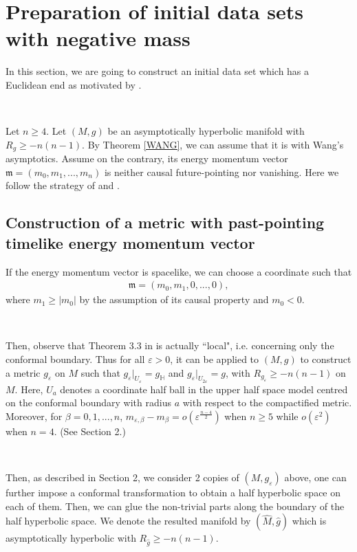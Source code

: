 \documentclass[11pt]{amsart}
\newcommand{\be}{\begin{equation}}
\newcommand{\ee}{\end{equation}}
\theoremstyle{remark}
\numberwithin{equation}{section}
\def\be{\begin{equation}}
\def\ee{\end{equation}}
\def\b{{\beta}}
\def\eps{\varepsilon}
\def\m{\mathfrak{m}}
\def\HH{\mathbb{H}}
\begin{document}
{{\section{Preparation of initial data sets with negative mass}\label{PIDS} In this section, we are going to construct an initial data set which has a Euclidean end as motivated by \cite{CD19}. 

\

Let $n\geq 4$. Let $(M,g)$ be an asymptotically hyperbolic manifold with $R_g\geq -n(n-1)$. By Theorem \ref{WANG}, we can assume that it is with Wang's asymptotics. Assume on the contrary, its energy momentum vector $\m=(m_0, m_1,...,m_n)$ is neither causal future-pointing nor vanishing. Here we follow the strategy of \cite{CD19} and \cite{CGNP18}. 

\subsection{Construction of a metric with past-pointing timelike energy momentum vector}
If the energy momentum vector is spacelike, we can choose a coordinate such that 
\be
\begin{split}
\m=(m_0, m_1,0,...,0), 
\end{split}
\ee 
where $m_1 \geq |m_0|$ by the assumption of its causal property and $m_0<0$. 

\


Then, observe that Theorem 3.3 in \cite{CD15} is actually ``local", i.e. concerning only the conformal boundary. Thus for all $\eps>0$, it can be applied to $(M,g)$ to construct a metric $g_{\eps}$ on $M$ such that $g_{\eps}|_{U_{\eps}}=g_{\HH}$ and $g_{\eps}|_{U_{2\eps}}=g$, with $R_{g_{\eps}}\geq -n(n-1)$ on $M$. Here, $U_{a}$ denotes a coordinate half ball in the upper half space model centred on the conformal boundary with radius $a$ with respect to the compactified metric. Moreover, for $\b=0,1,...,n$, $m_{\eps,\b}-m_{\b}=o(\eps^{\frac{n-4}{2}})$ when $n\geq 5$ while $o(\eps^2)$ when $n=4$. (See \cite{CD19} Section 2.) 

\

Then, as described in \cite{CD19} Section 2, we consider 2 copies of $(M,g_{\eps})$ above, one can further impose a conformal transformation to obtain a half hyperbolic space on each of them. Then, we can glue the non-trivial parts along the boundary of the half hyperbolic space. We denote the resulted manifold by $(\hat M, \hat g)$ which is asymptotically hyperbolic with $R_{\hat g}\geq -n(n-1)$. 

}}
\end{document}
